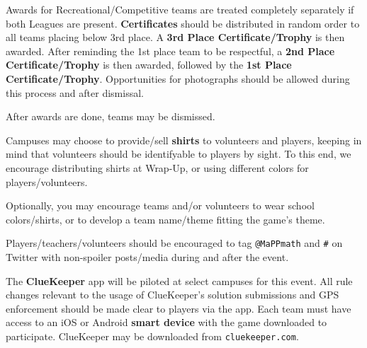 Awards for Recreational/Competitive teams are treated completely separately
if both Leagues are present.
\textbf{Certificates} should be distributed in random order to all teams placing
below 3rd place. A \textbf{3rd Place Certificate/Trophy} is then awarded.
After reminding the 1st place team to be respectful, a
\textbf{2nd Place Certificate/Trophy} is then awarded, followed by the
\textbf{1st Place Certificate/Trophy}. Opportunities for photographs should
be allowed during this process and after dismissal.

After awards are done, teams may be dismissed.


Campuses may choose to provide/sell \textbf{shirts} to volunteers and players,
keeping in mind that volunteers should be identifyable to players by sight.
To this end, we encourage distributing shirts at Wrap-Up, or using different
colors for players/volunteers.

Optionally, you may encourage teams and/or volunteers to
wear school colors/shirts, or to develop a team name/theme fitting the
game's theme.


Players/teachers/volunteers should be encouraged to tag \texttt{@MaPPmath}
and \texttt{\#\phEventAbbr} on Twitter with non-spoiler posts/media during
and after the event.


The \textbf{ClueKeeper} app will be piloted at select campuses for this
event. All rule changes relevant to the usage of ClueKeeper's
solution submissions and GPS enforcement should be made clear to players
via the app. Each team must have access to an iOS or Android
\textbf{smart device} with the game downloaded to participate.
ClueKeeper may be downloaded from \texttt{cluekeeper.com}.

